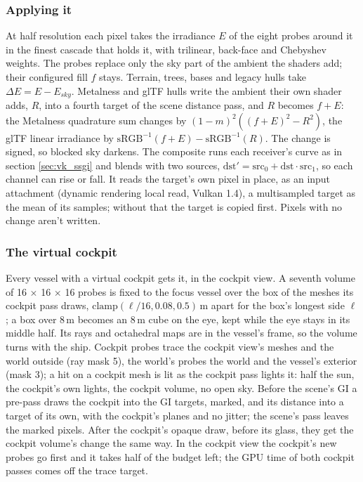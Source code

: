 \documentclass[Orbiter Technical Reference.tex]{subfiles}
\begin{document}
\begin{sloppypar}
\subsubsection{Applying it}
At half resolution each pixel takes the irradiance $E$ of the eight probes around it in the finest cascade that holds it, with trilinear, back-face and Chebyshev weights. The probes replace only the sky part of the ambient the shaders add; their configured fill $f$ stays. Terrain, trees, bases and legacy hulls take $\Delta E = E - E_{sky}$. Metalness and glTF hulls write the ambient their own shader adds, $R$, into a fourth target of the scene distance pass, and $R$ becomes $f + E$: the Metalness quadrature sum changes by $(1-m)^{2}\left((f + E)^{2} - R^{2}\right)$, the glTF linear irradiance by $\mathrm{sRGB}^{-1}(f + E) - \mathrm{sRGB}^{-1}(R)$. The change is signed, so blocked sky darkens. The composite runs each receiver's curve as in section \ref{sec:vk_ssgi} and blends with two sources, $\mathrm{dst}' = \mathrm{src}_{0} + \mathrm{dst}\cdot\mathrm{src}_{1}$, so each channel can rise or fall. It reads the target's own pixel in place, as an input attachment (dynamic rendering local read, Vulkan 1.4), a multisampled target as the mean of its samples; without that the target is copied first. Pixels with no change aren't written.

\subsubsection{The virtual cockpit}
Every vessel with a virtual cockpit gets it, in the cockpit view. A seventh volume of 16 $\times$ 16 $\times$ 16 probes is fixed to the focus vessel over the box of the meshes its cockpit pass draws, $\mathrm{clamp}(\ell/16, 0.08, 0.5)$\,m apart for the box's longest side $\ell$; a box over 8\,m becomes an 8\,m cube on the eye, kept while the eye stays in its middle half. Its rays and octahedral maps are in the vessel's frame, so the volume turns with the ship. Cockpit probes trace the cockpit view's meshes and the world outside (ray mask 5), the world's probes the world and the vessel's exterior (mask 3); a hit on a cockpit mesh is lit as the cockpit pass lights it: half the sun, the cockpit's own lights, the cockpit volume, no open sky. Before the scene's GI a pre-pass draws the cockpit into the GI targets, marked, and its distance into a target of its own, with the cockpit's planes and no jitter; the scene's pass leaves the marked pixels. After the cockpit's opaque draw, before its glass, they get the cockpit volume's change the same way. In the cockpit view the cockpit's new probes go first and it takes half of the budget left; the GPU time of both cockpit passes comes off the trace target.


\end{sloppypar}
\end{document}
